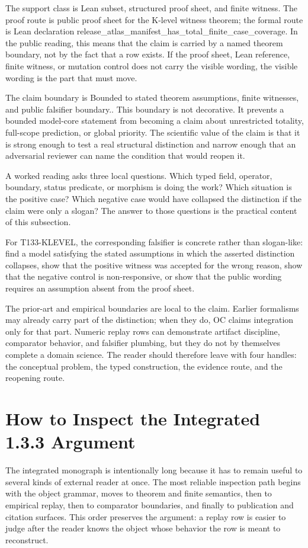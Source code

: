 The support class is Lean subset, structured proof sheet, and finite witness. The proof route is public proof sheet for the K-level witness theorem; the formal route is Lean declaration release\_atlas\_manifest\_has\_total\_finite\_case\_coverage. In the public reading, this means that the claim is carried by a named theorem boundary, not by the fact that a row exists. If the proof sheet, Lean reference, finite witness, or mutation control does not carry the visible wording, the visible wording is the part that must move.

The claim boundary is Bounded to stated theorem assumptions, finite witnesses, and public falsifier boundary.. This boundary is not decorative. It prevents a bounded model-core statement from becoming a claim about unrestricted totality, full-scope prediction, or global priority. The scientific value of the claim is that it is strong enough to test a real structural distinction and narrow enough that an adversarial reviewer can name the condition that would reopen it.

A worked reading asks three local questions. Which typed field, operator, boundary, status predicate, or morphism is doing the work? Which situation is the positive case? Which negative case would have collapsed the distinction if the claim were only a slogan? The answer to those questions is the practical content of this subsection.

For T133-KLEVEL, the corresponding falsifier is concrete rather than slogan-like: find a model satisfying the stated assumptions in which the asserted distinction collapses, show that the positive witness was accepted for the wrong reason, show that the negative control is non-responsive, or show that the public wording requires an assumption absent from the proof sheet.

The prior-art and empirical boundaries are local to the claim. Earlier formalisms may already carry part of the distinction; when they do, OC claims integration only for that part. Numeric replay rows can demonstrate artifact discipline, comparator behavior, and falsifier plumbing, but they do not by themselves complete a domain science. The reader should therefore leave with four handles: the conceptual problem, the typed construction, the evidence route, and the reopening route.


\section{How to Inspect the Integrated 1.3.3 Argument}
\label{sec:oc133-scientific-reading-protocol}
The integrated monograph is intentionally long because it has to remain useful to several kinds of external reader at once. The most reliable inspection path begins with the object grammar, moves to theorem and finite semantics, then to empirical replay, then to comparator boundaries, and finally to publication and citation surfaces. This order preserves the argument: a replay row is easier to judge after the reader knows the object whose behavior the row is meant to reconstruct.

